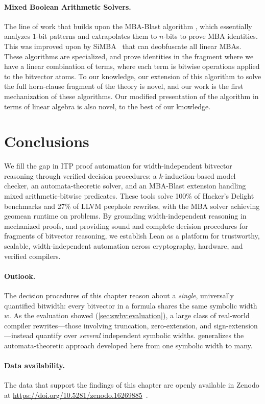 \paragraph{Mixed Boolean Arithmetic Solvers.}
The line of work that builds upon the MBA-Blast algorithm \cite{liu2021mba},
which essentially analyzes $1$-bit patterns and extrapolates them to $n$-bits to prove MBA identities.
This was improved upon by SiMBA~\cite{reichenwallner2022efficient} that can deobfuscate all linear MBAs.
These algorithms are specialized, and prove identities in the fragment where we have a linear combination of terms,
where each term is bitwise operations applied to the bitvector atoms.
To our knowledge, our extension of this algorithm to solve the full horn-clause fragment of the theory is novel,
and our work is the first mechanization of these algorithms.
Our modified presentation of the algorithm in terms of linear algebra is also novel, to the best of our knowledge.

\section{Conclusions}
\label{sec:swbv:conclusion}

We fill the gap in ITP proof automation for width-independent bitvector reasoning through verified decision procedures:
a $k$-induction-based model checker,
an automata-theoretic solver,
and an MBA-Blast extension handling mixed arithmetic-bitwise predicates.
These tools solve 100\% of Hacker’s Delight benchmarks and 27\% of LLVM peephole rewrites,
with the MBA solver achieving \MBAMBAGeoMean{} geomean runtime on \MBATotalProblems{} problems.
By grounding width-independent reasoning in mechanized proofs,
and providing sound and complete decision procedures for fragments of bitvector reasoning,
we establish Lean as a platform for trustworthy, scalable, width-independent automation across cryptography, hardware, and verified compilers.

\paragraph{Outlook.}
The decision procedures of this chapter reason about a \emph{single},
universally quantified bitwidth: every bitvector in a formula shares the same
symbolic width~$w$. As the evaluation showed (\cref{sec:swbv:evaluation}), a
large class of real-world compiler rewrites---those involving truncation,
zero-extension, and sign-extension---instead quantify over \emph{several}
independent symbolic widths.  generalizes the
automata-theoretic approach developed here from one symbolic width to many.

\paragraph{Data availability.}
The data that support the findings of this chapter are openly available in
Zenodo at \url{https://doi.org/10.5281/zenodo.16269885}~\cite{bhat_2025_16269885}.
